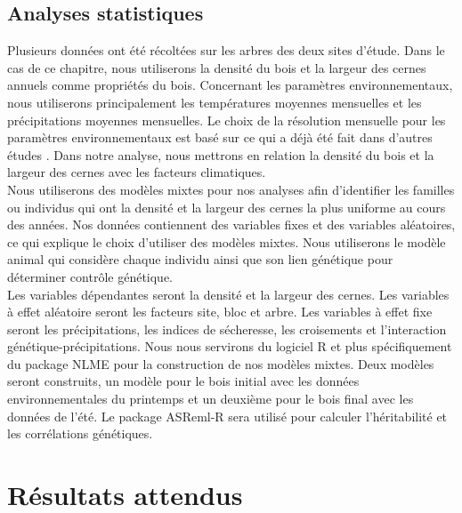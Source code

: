 \documentclass[a4paper,12pt]{report}
\begin{document}
\subsection*{Analyses statistiques}
Plusieurs données ont été récoltées sur les arbres des deux sites d'étude. Dans le cas de ce chapitre, nous utiliserons la densité du bois et la largeur des cernes annuels comme propriétés du bois. Concernant les paramètres environnementaux, nous utiliserons principalement les températures moyennes mensuelles et les précipitations moyennes mensuelles. Le choix de la résolution mensuelle pour les paramètres environnementaux est basé sur ce qui a déjà été fait dans d'autres études \citep{Franceschini2017}. Dans notre analyse, nous mettrons en relation la densité du bois et la largeur des cernes avec les facteurs climatiques. \\

Nous utiliserons des modèles mixtes pour nos analyses afin d'identifier les familles ou individus qui ont la densité et la largeur des cernes la plus uniforme au cours des années. Nos données contiennent des variables fixes et des variables aléatoires, ce qui explique le choix d'utiliser des modèles mixtes. Nous utiliserons le modèle animal qui considère chaque individu ainsi que son lien génétique pour déterminer contrôle génétique. \\ 
Les variables dépendantes seront la densité et la largeur des cernes. Les variables à effet aléatoire seront les facteurs site, bloc et arbre. Les variables à effet fixe seront les précipitations, les indices de sécheresse, les croisements et l'interaction génétique-précipitations. Nous nous servirons du logiciel R \citep{R2018} et plus spécifiquement du package NLME \citep{NLME2018} pour la construction de nos modèles mixtes. Deux modèles seront construits, un modèle pour le bois initial avec les données environnementales du printemps et un deuxième pour le bois final avec les données de l'été. Le package ASReml-R sera utilisé pour calculer l'héritabilité et les corrélations génétiques. 


\section{Résultats attendus}
\end{document}

